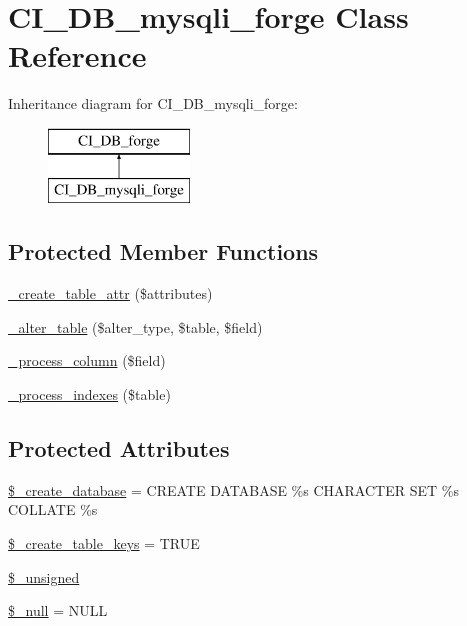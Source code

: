 \hypertarget{class_c_i___d_b__mysqli__forge}{}\section{C\+I\+\_\+\+D\+B\+\_\+mysqli\+\_\+forge Class Reference}
\label{class_c_i___d_b__mysqli__forge}
Inheritance diagram for C\+I\+\_\+\+D\+B\+\_\+mysqli\+\_\+forge\+:\begin{figure}[H]
\begin{center}
\leavevmode
\includegraphics[height=2.000000cm]{class_c_i___d_b__mysqli__forge}
\end{center}
\end{figure}
\subsection*{Protected Member Functions}
\begin{DoxyCompactItemize}
\item 
\mbox{\hyperlink{class_c_i___d_b__mysqli__forge_a10b25326d82f6ddd9af1935e52e42b72}{\+\_\+create\+\_\+table\+\_\+attr}} (\$attributes)
\item 
\mbox{\hyperlink{class_c_i___d_b__mysqli__forge_a41c6cae02f2fda8b429ad0afb9509426}{\+\_\+alter\+\_\+table}} (\$alter\+\_\+type, \$table, \$field)
\item 
\mbox{\hyperlink{class_c_i___d_b__mysqli__forge_a8f38f1c5b5dddecca4befbe393f3f299}{\+\_\+process\+\_\+column}} (\$field)
\item 
\mbox{\hyperlink{class_c_i___d_b__mysqli__forge_ae0bdb4ea3418590d1894c5b621b5ca50}{\+\_\+process\+\_\+indexes}} (\$table)
\end{DoxyCompactItemize}
\subsection*{Protected Attributes}
\begin{DoxyCompactItemize}
\item 
\mbox{\hyperlink{class_c_i___d_b__mysqli__forge_acd23c9a8735806155f1a5d0a87c151f2}{\$\+\_\+create\+\_\+database}} = \textquotesingle{}C\+R\+E\+A\+TE D\+A\+T\+A\+B\+A\+SE \%s C\+H\+A\+R\+A\+C\+T\+ER S\+ET \%s C\+O\+L\+L\+A\+TE \%s\textquotesingle{}
\item 
\mbox{\hyperlink{class_c_i___d_b__mysqli__forge_a73e07acdd35c948ad353903c2827af6e}{\$\+\_\+create\+\_\+table\+\_\+keys}} = T\+R\+UE
\item 
\mbox{\hyperlink{class_c_i___d_b__mysqli__forge_aae977ae6d61fa183f0b25422b6ddc31c}{\$\+\_\+unsigned}}
\item 
\mbox{\hyperlink{class_c_i___d_b__mysqli__forge_ae58fe6a5104d4a069a49b27533ce808f}{\$\+\_\+null}} = \textquotesingle{}N\+U\+LL\textquotesingle{}
\end{DoxyCompactItemize}
